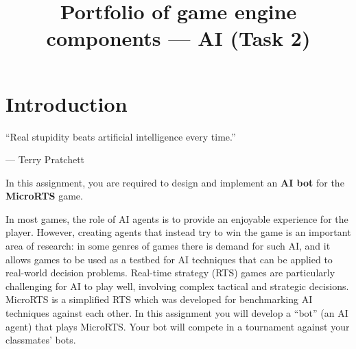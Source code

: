 \title{Portfolio of game engine components --- AI (Task 2)}

\maketitle

\label{p:part2-start}

\section*{Introduction}

\begin{marginquote}
``Real stupidity beats artificial intelligence every time.''

--- Terry Pratchett
\end{marginquote}

In this assignment, you are required to design and implement
an \textbf{AI bot} for the \textbf{MicroRTS} game.

In most games, the role of AI agents is to provide an enjoyable experience for the player.
However, creating agents that instead try to win the game is an important area of research:
in some genres of games there is demand for such AI,
and it allows games to be used as a testbed for AI techniques that can be applied to real-world decision problems.
Real-time strategy (RTS) games are particularly challenging for AI to play well,
involving complex tactical and strategic decisions.
MicroRTS is a simplified RTS which was developed for benchmarking AI techniques against each other.
In this assignment you will develop a ``bot'' (an AI agent) that plays MicroRTS.
Your bot will compete in a tournament against your classmates' bots.

